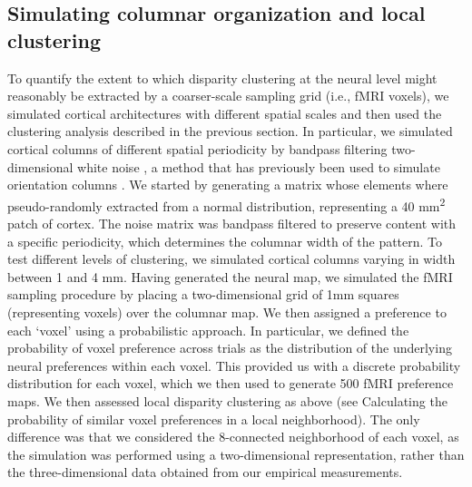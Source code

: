 \subsection{Simulating columnar organization and local clustering}
To quantify the extent to which disparity clustering at the neural level might reasonably be extracted by a coarser-scale sampling grid (i.e., fMRI voxels), we simulated cortical architectures with different spatial scales and then used the clustering analysis described in the previous section. In particular, we simulated cortical columns of different spatial periodicity by bandpass filtering two-dimensional white noise \cite{ROJER:1990bq}, a method that has previously been used to simulate orientation columns \cite{Boynton:2005bx}. We started by generating a matrix whose elements where pseudo-randomly extracted from a normal distribution, representing a 40 mm\textsuperscript{2} patch of cortex. The noise matrix was bandpass filtered to preserve content with a specific periodicity, which determines the columnar width of the pattern. To test different levels of clustering, we simulated cortical columns varying in width between 1 and 4 mm. Having generated the neural map, we simulated the fMRI sampling procedure by placing a two-dimensional grid of 1mm squares (representing voxels) over the columnar map. We then assigned a preference to each `voxel' using a probabilistic approach. In particular, we defined the probability of voxel preference across trials as the distribution of the underlying neural preferences within each voxel. This provided us with a discrete probability distribution for each voxel, which we then used to generate 500 fMRI preference maps. We then assessed local disparity clustering as above (see Calculating the probability of similar voxel preferences in a local neighborhood). The only difference was that we considered the 8-connected neighborhood of each voxel, as the simulation was performed using a two-dimensional representation, rather than the three-dimensional data obtained from our empirical measurements.

